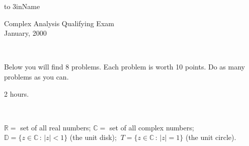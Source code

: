 \documentclass[12pt]{amsart}
\newcommand{\D}{\mathbb{D} }
\newcommand{\C}{\mathbb{C} }
\newcommand{\R}{\mathbb{R} }
\begin{document}
\hfill\hbox to 3in{Name\hrulefill}
\vspace{.5in}

\begin{center}{\large Complex Analysis Qualifying Exam}
\\\bigskip
{\large January, 2000}
\end{center}

\

  Below you will find 8 problems.
Each problem is worth 10 points. Do as many problems as you can.

 2 hours.

\

 $\R =$ set of all real numbers;
$\C =$ set of all complex numbers; $\D=\{z\in\C\,:\,|z|<1\}$ (the unit disk); $\
T=\{z\in\C\,:\,|z|=1\}$ (the unit circle).

\
\end{document}
